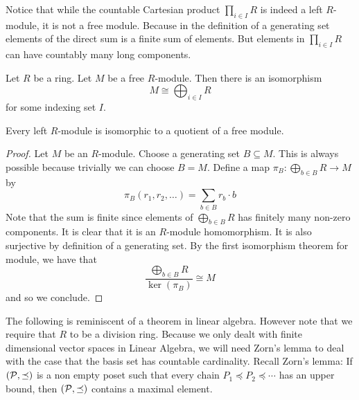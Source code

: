 \documentclass[a4paper]{article}
\begin{document}
Notice that while the countable Cartesian product $\prod_{i\in I}R$ is indeed a left $R$-module, it is not a free module. Because in the definition of a generating set elements of the direct sum is a finite sum of elements. But elements in $\prod_{i\in I}R$ can have countably many long components. 

\begin{prp}{}{} Let $R$ be a ring. Let $M$ be a free $R$-module. Then there is an isomorphism $$M\cong\bigoplus_{i\in I}R$$ for some indexing set $I$. 
\end{prp}

\begin{lmm}{}{} Every left $R$-module is isomorphic to a quotient of a free module. \tcbline
\begin{proof}
Let $M$ be an $R$-module. Choose a generating set $B\subseteq M$. This is always possible because trivially we can choose $B=M$. Define a map $\pi_B:\bigoplus_{b\in B}R\to M$ by $$\pi_B(r_1,r_2,\dots)=\sum_{b\in B}r_b\cdot b$$ Note that the sum is finite since elements of $\bigoplus_{b\in B}R$ has finitely many non-zero components. It is clear that it is an $R$-module homomorphism. It is also surjective by definition of a generating set. By the first isomorphism theorem for module, we have that $$\frac{\bigoplus_{b\in B}R}{\ker(\pi_B)}\cong M$$ and so we conclude. 
\end{proof}
\end{lmm}

The following is reminiscent of a theorem in linear algebra. However note that we require that $R$ to be a division ring. Because we only dealt with finite dimensional vector spaces in Linear Algebra, we will need Zorn's lemma to deal with the case that the basis set has countable cardinality. Recall Zorn's lemma: If $(\mathcal{P},\preceq)$ is a non empty poset such that every chain $P_1\preceq P_2\preceq\cdots$ has an upper bound, then $(\mathcal{P},\preceq)$ contains a maximal element. 
\end{document}
